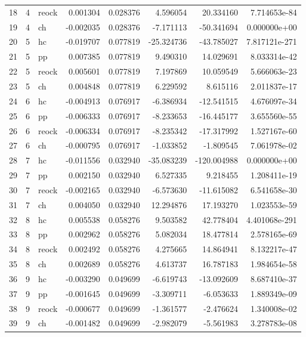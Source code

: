 \documentclass[]{article}
\begin{document}
\begin{tabular}{lrlrrrrr}
18 &      4 &  reock &   0.001304 &  0.028376 &      4.596054 &   20.334160 &   7.714653e-84 \\
19 &      4 &     ch &  -0.002035 &  0.028376 &     -7.171113 &  -50.341694 &   0.000000e+00 \\
20 &      5 &     hc &  -0.019707 &  0.077819 &    -25.324736 &  -43.785027 &  7.817121e-271 \\
21 &      5 &     pp &   0.007385 &  0.077819 &      9.490310 &   14.029691 &   8.033314e-42 \\
22 &      5 &  reock &   0.005601 &  0.077819 &      7.197869 &   10.059549 &   5.666063e-23 \\
23 &      5 &     ch &   0.004848 &  0.077819 &      6.229592 &    8.615116 &   2.011837e-17 \\
24 &      6 &     hc &  -0.004913 &  0.076917 &     -6.386934 &  -12.541515 &   4.676097e-34 \\
25 &      6 &     pp &  -0.006333 &  0.076917 &     -8.233653 &  -16.445177 &   3.655560e-55 \\
26 &      6 &  reock &  -0.006334 &  0.076917 &     -8.235342 &  -17.317992 &   1.527167e-60 \\
27 &      6 &     ch &  -0.000795 &  0.076917 &     -1.033852 &   -1.809545 &   7.061978e-02 \\
28 &      7 &     hc &  -0.011556 &  0.032940 &    -35.083239 & -120.004988 &   0.000000e+00 \\
29 &      7 &     pp &   0.002150 &  0.032940 &      6.527335 &    9.218455 &   1.208411e-19 \\
30 &      7 &  reock &  -0.002165 &  0.032940 &     -6.573630 &  -11.615082 &   6.541658e-30 \\
31 &      7 &     ch &   0.004050 &  0.032940 &     12.294876 &   17.193270 &   1.023553e-59 \\
32 &      8 &     hc &   0.005538 &  0.058276 &      9.503582 &   42.778404 &  4.401068e-291 \\
33 &      8 &     pp &   0.002962 &  0.058276 &      5.082034 &   18.477814 &   2.578165e-69 \\
34 &      8 &  reock &   0.002492 &  0.058276 &      4.275665 &   14.864941 &   8.132217e-47 \\
35 &      8 &     ch &   0.002689 &  0.058276 &      4.613737 &   16.787183 &   1.984654e-58 \\
36 &      9 &     hc &  -0.003290 &  0.049699 &     -6.619743 &  -13.092609 &   8.687410e-37 \\
37 &      9 &     pp &  -0.001645 &  0.049699 &     -3.309711 &   -6.053633 &   1.889349e-09 \\
38 &      9 &  reock &  -0.000677 &  0.049699 &     -1.361577 &   -2.476624 &   1.340008e-02 \\
39 &      9 &     ch &  -0.001482 &  0.049699 &     -2.982079 &   -5.561983 &   3.278783e-08 \\
\bottomrule
\end{tabular}

\clearpage


\end{document}
